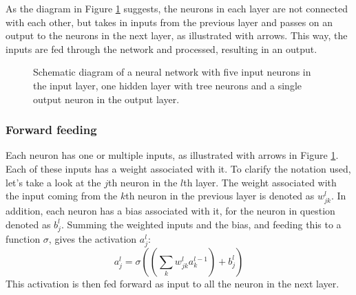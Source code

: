 As the diagram in Figure \ref{fig:NNstructure} suggests, the neurons in each layer are not connected with each other, but takes in inputs from the previous layer and passes on an output to the neurons in the next layer, as illustrated with arrows. This way, the inputs are fed through the network and processed, resulting in an output.
\begin{figure}[htbp]
	\centering
	\caption{Schematic diagram of a neural network with five input neurons in the input layer, one hidden layer with tree neurons and a single output neuron in the output layer.}
	\label{fig:NNstructure}
\end{figure}

\subsubsection*{Forward feeding}
Each neuron has one or multiple inputs, as illustrated with arrows in Figure \ref{fig:NNstructure}. Each of these inputs has a weight associated with it. To clarify the notation used, let's take a look at the $j$th neuron in the $l$th layer. The weight associated with the input coming from the $k$th neuron in the previous layer is denoted as $w^l_{jk}$. In addition, each neuron has a bias associated with it, for the neuron in question denoted as $b^l_j$. Summing the weighted inputs and the bias, and feeding this to a function $\sigma$, gives the activation $a^l_j$:
\begin{equation*}
	a^l_j = \sigma\left(\left(\sum_{k}w^l_{jk}a^{l-1}_k\right) + b^l_j\right)
\end{equation*}
This activation is then fed forward as input to all the neuron in the next layer.

